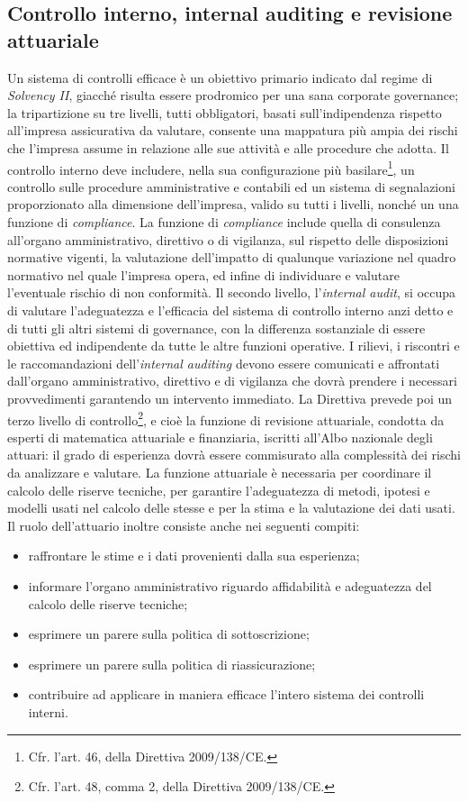 \subsection{Controllo interno, internal auditing e revisione attuariale}
Un sistema di controlli efficace è un obiettivo primario indicato dal regime di \textit{\textit{Solvency I}I}, giacché risulta essere prodromico per una sana corporate governance; la tripartizione su tre livelli, tutti obbligatori, basati sull’indipendenza rispetto all’impresa assicurativa da valutare, consente una mappatura più ampia dei rischi che l’impresa assume in relazione alle sue attività e alle procedure che adotta.
Il controllo interno deve includere, nella sua configurazione più basilare\footnote{Cfr. l’art. 46, della Direttiva 2009/138/CE.}, un controllo  sulle procedure amministrative e contabili ed un sistema di segnalazioni proporzionato  alla dimensione dell’impresa, valido su tutti i livelli, nonché un una funzione di {\itshape compliance}. La funzione di {\itshape compliance} include quella di consulenza all’organo amministrativo, direttivo o di vigilanza, sul rispetto delle disposizioni normative vigenti, la valutazione dell’impatto di qualunque variazione nel quadro normativo nel quale  l’impresa opera, ed infine di individuare e valutare l’eventuale rischio di non conformità.
Il secondo livello, l’{\itshape internal audit}, si occupa di valutare l’adeguatezza e l’efficacia del sistema di controllo interno anzi detto e di tutti gli altri sistemi di governance, con la differenza sostanziale di essere obiettiva ed indipendente da tutte le altre funzioni operative. I rilievi, i riscontri e le raccomandazioni dell’{\itshape internal auditing} devono essere comunicati e affrontati dall’organo amministrativo, direttivo e di vigilanza che dovrà prendere i necessari provvedimenti garantendo un intervento immediato.
La Direttiva prevede poi un terzo livello di controllo\footnote{Cfr. l’art. 48, comma 2, della Direttiva 2009/138/CE.}, e cioè la funzione di revisione attuariale, condotta da esperti di matematica attuariale e finanziaria, iscritti all’Albo nazionale degli attuari: il grado di esperienza dovrà essere commisurato alla complessità dei rischi da analizzare e valutare.
La funzione attuariale è necessaria per coordinare il calcolo delle riserve tecniche, per garantire l’adeguatezza di metodi, ipotesi e modelli usati nel calcolo delle stesse e per la stima e la valutazione dei dati usati. Il ruolo dell’attuario inoltre consiste anche nei seguenti compiti:
\begin{itemize}
\item raffrontare le stime e i dati provenienti dalla sua esperienza;
\item informare l’organo amministrativo riguardo affidabilità e adeguatezza del calcolo delle riserve tecniche;
\item esprimere un parere sulla politica di sottoscrizione;
\item esprimere un parere sulla politica di riassicurazione;
\item contribuire ad applicare in maniera efficace l’intero sistema dei controlli interni.
\end{itemize}

